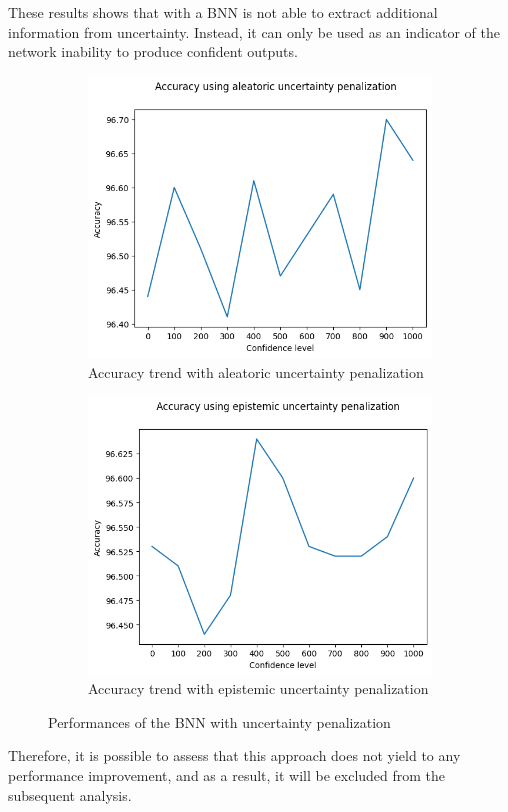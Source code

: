 These results shows that with a BNN is not able to extract additional information from uncertainty. Instead, it can only be used as an indicator of the network inability to produce confident outputs.

\begin{figure}[h]
	\centering
	\begin{subfigure}{.5\textwidth}
		\centering
		\includegraphics[width=0.8\linewidth]{ImageFiles/ClassifUncer/aleat_penalization}
		\caption{Accuracy trend with aleatoric uncertainty penalization}
		\label{fig:aleat_penalization}
	\end{subfigure}%
	\begin{subfigure}{.5\textwidth}
		\centering
		\includegraphics[width=0.8\linewidth]{ImageFiles/ClassifUncer/epis_penalization}
		\caption{Accuracy trend with epistemic uncertainty penalization}
		\label{fig:epis_penalization}
	\end{subfigure}
	\caption{Performances of the BNN with uncertainty penalization}
	\label{fig:penalization_class}
\end{figure}

Therefore, it is possible to assess that this approach does not yield to any performance improvement, and as a result, it will be excluded from the subsequent analysis.